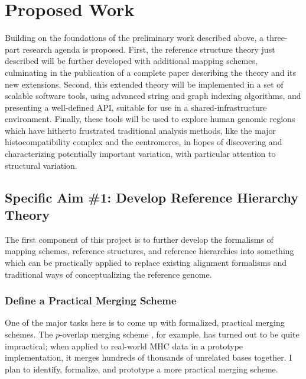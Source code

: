 \documentclass[11pt,proposal]{ucthesis}
\begin{document}




\chapter{Proposed Work}

Building on the foundations of the preliminary work described above, a three-part research agenda is proposed. First, the reference structure theory just described will be further developed with additional mapping schemes, culminating in the publication of a complete paper describing the theory and its new extensions. Second, this extended theory will be implemented in a set of scalable software tools, using advanced string and graph indexing algorithms, and presenting a well-defined API, suitable for use in a shared-infrastructure environment. Finally, these tools will be used to explore human genomic regions which have hitherto frustrated traditional analysis methods, like the major histocompatibility complex and the centromeres, in hopes of discovering and characterizing potentially important variation, with particular attention to structural variation.

\section{Specific Aim \#1: Develop Reference Hierarchy Theory}

The first component of this project is to further develop the formalisms of mapping schemes, reference structures, and reference hierarchies into something which can be practically applied to replace existing alignment formalisms and traditional ways of conceptualizing the reference genome.

\subsection{Define a Practical Merging Scheme}

One of the major tasks here is to come up with formalized, practical merging schemes. The $p$-overlap merging scheme \cite{paten2014mapping}, for example, has turned out to be quite impractical; when applied to real-world MHC data in a prototype implementation, it merges hundreds of thousands of unrelated bases together. I plan to identify, formalize, and prototype a more practical merging scheme.
\end{document}
